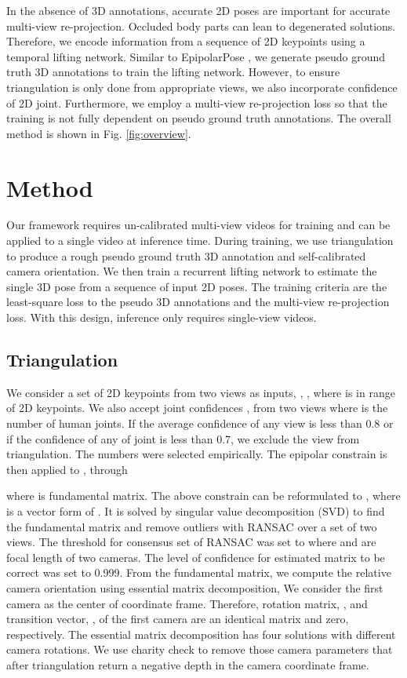 \documentclass[10pt,twocolumn,letterpaper]{article}
\begin{document}
In the absence of 3D annotations, accurate 2D poses are important for accurate multi-view re-projection. Occluded body parts can lean to degenerated solutions. Therefore, we encode information from a sequence of 2D keypoints using a temporal lifting network. Similar to EpipolarPose \cite{Kocabas_2019_CVPR}, we generate pseudo ground truth 3D annotations to train the lifting network. However, to ensure triangulation is only done from appropriate views, we also incorporate confidence of 2D joint. Furthermore, we employ a multi-view re-projection loss so that the training is not fully dependent on pseudo ground truth annotations. The overall method is shown in Fig. \ref{fig:overview}.    

\section{Method}
Our framework requires un-calibrated multi-view videos for training and can be applied to a single video at inference time. During training, we use triangulation to produce a rough pseudo ground truth 3D annotation and self-calibrated camera orientation. We then train a recurrent lifting network to estimate the single 3D pose from a sequence of input 2D poses. The training criteria are the least-square loss to the pseudo 3D annotations and the multi-view re-projection loss. With this design, inference only requires single-view videos. 

\subsection{Triangulation}
\label{sec:triangulation}

We consider a set of 2D keypoints from two views as inputs, , , where  is in range of 2D keypoints. We also accept joint confidences ,  from two views where  is the number of human joints. If the average confidence of any view is less than 0.8 or if the confidence of any of joint is less than 0.7, we exclude the view from triangulation. The numbers were selected empirically. The epipolar constrain is then applied to ,  through

where  is fundamental matrix. The above constrain can be reformulated to , where  is a vector form of . It is solved by singular value decomposition (SVD) to find the fundamental matrix and remove outliers with RANSAC over a set of two views. The threshold for consensus set of RANSAC was set to  where  and  are focal length of two cameras. The level of confidence for estimated matrix to be correct was set to 0.999. From the fundamental matrix, we compute the relative camera orientation using essential matrix decomposition,  
We consider the first camera as the center of coordinate frame. Therefore, rotation matrix, , and transition vector, , of the first camera are an identical matrix and zero, respectively. The essential matrix decomposition has four solutions with different camera rotations. We use charity check to remove those camera parameters that after triangulation return a negative depth in the camera coordinate frame. 
\end{document}
